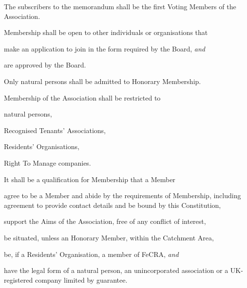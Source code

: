 \documentclass[12pt]{article}
\newcommand{\EC}[0]{Board}
\newcommand{\RA}[0]{Residents' Organisation}
\newcommand{\RTA}[0]{Recognised Tenants' Association}
\newcommand{\ITand}[0]{\textit{and}}
\begin{document}
\begin{constenum}

  \item The subscribers to the memorandum shall be the first Voting Members
    of the Association.

  \item Membership shall be open to other individuals or organisations that
    \begin{constenum}
      \item make an application to join in the form required by the \EC, \ITand
      \item are approved by the \EC.
    \end{constenum}

  \item Only natural persons shall be admitted to Honorary Membership.

  \item Membership of the Association shall be restricted to
    \begin{constenum}
    \item natural persons,
    \item \RTA{}s,
    \item \RA{}s,
    \item Right To Manage companies.
    \end{constenum}

  \item It shall be a qualification for Membership that a Member
    \begin{constenum}

    \item agree to be a Member and abide by the requirements of
      Membership, including agreement to provide contact details and
      be bound by this Constitution,

    \item support the Aims of the Association, free of any conflict
      of interest,

    \item be situated, unless an Honorary Member,
      within the Catchment Area,\label{catchmentqual}
      
    \item be, if a \RA, a member of FeCRA, \ITand

    \item have the legal form of a natural person, an unincorporated
      association or a UK-registered company limited by guarantee.

    \end{constenum}


\end{constenum}
\end{document}
